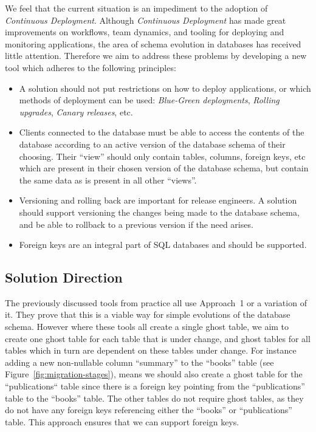 \documentclass[conference]{IEEEtran}
\begin{document}
We feel that the current situation is an impediment to the adoption of \textit{Continuous Deployment}. Although \textit{Continuous Deployment} has made great improvements on workflows, team dynamics, and tooling for deploying and monitoring applications, the area of schema evolution in databases has received little attention. Therefore we aim to address these problems by developing a new tool which adheres to the following principles:

\begin{itemize}
  \item{A solution should not put restrictions on how to deploy applications, or which methods of deployment can be used: \textit{Blue-Green deployments}, \textit{Rolling upgrades}, \textit{Canary releases}, etc.}
  \item{Clients connected to the database must be able to access the contents of the database according to an active version of the database schema of their choosing. Their ``view'' should only contain tables, columns, foreign keys, etc which are present in their chosen version of the database schema, but contain the same data as is present in all other ``views''.}
  \item{Versioning and rolling back are important for release engineers. A solution should support versioning the changes being made to the database schema, and be able to rollback to a previous version if the need arises.}
  \item{Foreign keys are an integral part of SQL databases and should be supported.}
\end{itemize}

\subsection{Solution Direction}

The previously discussed tools from practice all use Approach~1 or a variation of it. They prove that this is a viable way for simple evolutions of the database schema. However where these tools all create a single ghost table, we aim to create one ghost table for each table that is under change, and ghost tables for all tables which in turn are dependent on these tables under change. For instance adding a new non-nullable column ``summary'' to the ``books'' table (see Figure~\ref{fig:migration-stages}), means we should also create a ghost table for the ``publications`` table since there is a foreign key pointing from the ``publications'' table to the ``books'' table. The other tables do not require ghost tables, as they do not have any foreign keys referencing either the ``books'' or ``publications'' table. This approach ensures that we can support foreign keys.
\end{document}
